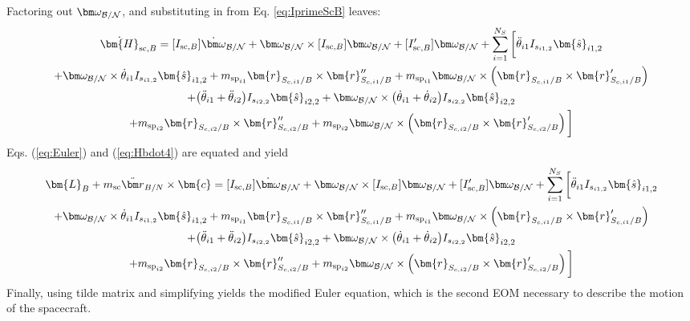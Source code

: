Factoring out $\bm\omega_{\cal B/N}$, and substituting in from Eq. \ref{eq:IprimeScB} leaves:
\begin{multline}
	\dot{\bm{H}}_{\text{sc},B} = [I_{\text{sc},B}] \dot{\bm\omega}_{\cal B/N} + \bm\omega_{\cal B/N} \times [I_{\text{sc},B}] \bm\omega_{\cal B/N} + [I'_{\text{sc},B}] \bm\omega_{\cal B/N}
	+  \sum\limits_{i=1}^{N_S} \bigg[ \ddot{\theta}_{i1} I_{s_{i1,2}}\bm{\hat{s}}_{i1,2}\\
	+ \bm\omega_{\cal B/N} \times \dot{\theta}_{i1} I_{s_{i1,2}}\bm{\hat{s}}_{i1,2}
	+m_{\text{sp}_{i1}} \bm{r}_{S_{c,i1}/B} \times \bm{r}''_{S_{c,i1}/B}
	+m_{\text{sp}_{i1}} \bm\omega_{\cal B/N} \times \left(\bm{r}_{S_{c,i1}/B} \times \bm{r}'_{S_{c,i1}/B}\right)\\
	+\big(\ddot{\theta}_{i1}+\ddot{\theta}_{i2}\big) I_{s_{i2,2}}\bm{\hat{s}}_{i2,2}
	+ \bm\omega_{\cal B/N} \times \big(\dot{\theta}_{i1}+\dot{\theta}_{i2}\big) I_{s_{i2,2}}\bm{\hat{s}}_{i2,2} \\
	+m_{\text{sp}_{i2}} \bm{r}_{S_{c,i2}/B} \times \bm{r}''_{S_{c,i2}/B}
	+m_{\text{sp}_{i2}} \bm\omega_{\cal B/N} \times \left(\bm{r}_{S_{c,i2}/B} \times \bm{r}'_{S_{c,i2}/B}\right)\bigg]
	\label{eq:Hbdot4}
\end{multline}
Eqs. (\ref{eq:Euler}) and (\ref{eq:Hbdot4}) are equated and yield
\begin{multline}
	\bm{L}_B+m_{\text{sc}}\ddot{\bm r}_{B/N}\times\bm{c} = [I_{\text{sc},B}] \dot{\bm\omega}_{\cal B/N} + \bm\omega_{\cal B/N} \times [I_{\text{sc},B}] \bm\omega_{\cal B/N} + [I'_{\text{sc},B}] \bm\omega_{\cal B/N}
	+  \sum\limits_{i=1}^{N_S} \bigg[ \ddot{\theta}_{i1} I_{s_{i1,2}}\bm{\hat{s}}_{i1,2}\\
	+ \bm\omega_{\cal B/N} \times \dot{\theta}_{i1} I_{s_{i1,2}}\bm{\hat{s}}_{i1,2}
	+m_{\text{sp}_{i1}} \bm{r}_{S_{c,i1}/B} \times \bm{r}''_{S_{c,i1}/B}
	+m_{\text{sp}_{i1}} \bm\omega_{\cal B/N} \times \left(\bm{r}_{S_{c,i1}/B} \times \bm{r}'_{S_{c,i1}/B}\right)\\
	+\big(\ddot{\theta}_{i1}+\ddot{\theta}_{i2}\big) I_{s_{i2,2}}\bm{\hat{s}}_{i2,2}
	+ \bm\omega_{\cal B/N} \times \big(\dot{\theta}_{i1}+\dot{\theta}_{i2}\big) I_{s_{i2,2}}\bm{\hat{s}}_{i2,2} \\
	+m_{\text{sp}_{i2}} \bm{r}_{S_{c,i2}/B} \times \bm{r}''_{S_{c,i2}/B}
	+m_{\text{sp}_{i2}} \bm\omega_{\cal B/N} \times \left(\bm{r}_{S_{c,i2}/B} \times \bm{r}'_{S_{c,i2}/B}\right)\bigg]
	\label{eq:Hbdot5}
\end{multline}
Finally, using tilde matrix and simplifying yields the modified Euler equation, which is the second EOM necessary to describe the motion of the spacecraft.

